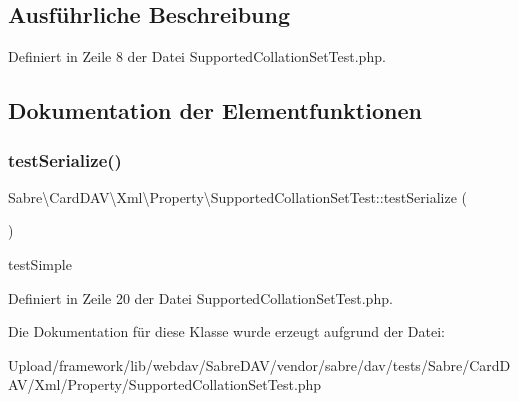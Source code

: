 \subsection{Ausführliche Beschreibung}


Definiert in Zeile 8 der Datei Supported\+Collation\+Set\+Test.\+php.



\subsection{Dokumentation der Elementfunktionen}
\mbox{\label{class_sabre_1_1_card_d_a_v_1_1_xml_1_1_property_1_1_supported_collation_set_test_af49e871b5135d63e5b50e0e038313091}} 
\subsubsection{\texorpdfstring{test\+Serialize()}{testSerialize()}}
{\footnotesize\ttfamily Sabre\textbackslash{}\+Card\+D\+A\+V\textbackslash{}\+Xml\textbackslash{}\+Property\textbackslash{}\+Supported\+Collation\+Set\+Test\+::test\+Serialize (\begin{DoxyParamCaption}{ }\end{DoxyParamCaption})}

test\+Simple 

Definiert in Zeile 20 der Datei Supported\+Collation\+Set\+Test.\+php.



Die Dokumentation für diese Klasse wurde erzeugt aufgrund der Datei\+:\begin{DoxyCompactItemize}
\item 
Upload/framework/lib/webdav/\+Sabre\+D\+A\+V/vendor/sabre/dav/tests/\+Sabre/\+Card\+D\+A\+V/\+Xml/\+Property/Supported\+Collation\+Set\+Test.\+php\end{DoxyCompactItemize}
